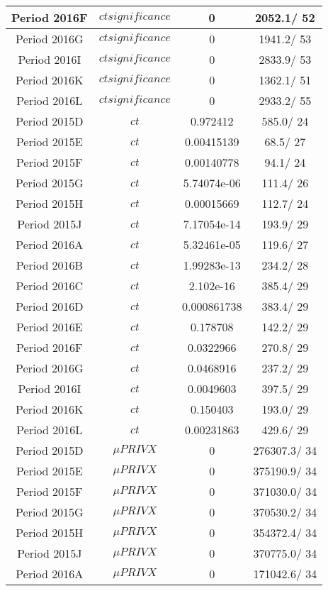 \documentclass{article}
\begin{document}
\begin{longtable}{c|c|c|c}
\hline
 Period 2016F & $ct significance$ & 0 & 2052.1/ 52\\
\hline
 Period 2016G & $ct significance$ & 0 & 1941.2/ 53\\
\hline
 Period 2016I & $ct significance$ & 0 & 2833.9/ 53\\
\hline
 Period 2016K & $ct significance$ & 0 & 1362.1/ 51\\
\hline
 Period 2016L & $ct significance$ & 0 & 2933.2/ 55\\
\hline
 Period 2015D & $ct$ & 0.972412 & 585.0/ 24\\
\hline
 Period 2015E & $ct$ & 0.00415139 &  68.5/ 27\\
\hline
 Period 2015F & $ct$ & 0.00140778 &  94.1/ 24\\
\hline
 Period 2015G & $ct$ & 5.74074e-06 & 111.4/ 26\\
\hline
 Period 2015H & $ct$ & 0.00015669 & 112.7/ 24\\
\hline
 Period 2015J & $ct$ & 7.17054e-14 & 193.9/ 29\\
\hline
 Period 2016A & $ct$ & 5.32461e-05 & 119.6/ 27\\
\hline
 Period 2016B & $ct$ & 1.99283e-13 & 234.2/ 28\\
\hline
 Period 2016C & $ct$ & 2.102e-16 & 385.4/ 29\\
\hline
 Period 2016D & $ct$ & 0.000861738 & 383.4/ 29\\
\hline
 Period 2016E & $ct$ & 0.178708 & 142.2/ 29\\
\hline
 Period 2016F & $ct$ & 0.0322966 & 270.8/ 29\\
\hline
 Period 2016G & $ct$ & 0.0468916 & 237.2/ 29\\
\hline
 Period 2016I & $ct$ & 0.0049603 & 397.5/ 29\\
\hline
 Period 2016K & $ct$ & 0.150403 & 193.0/ 29\\
\hline
 Period 2016L & $ct$ & 0.00231863 & 429.6/ 29\\
\hline
 Period 2015D & $\mu PRIVX$ & 0 & 276307.3/ 34\\
\hline
 Period 2015E & $\mu PRIVX$ & 0 & 375190.9/ 34\\
\hline
 Period 2015F & $\mu PRIVX$ & 0 & 371030.0/ 34\\
\hline
 Period 2015G & $\mu PRIVX$ & 0 & 370530.2/ 34\\
\hline
 Period 2015H & $\mu PRIVX$ & 0 & 354372.4/ 34\\
\hline
 Period 2015J & $\mu PRIVX$ & 0 & 370775.0/ 34\\
\hline
 Period 2016A & $\mu PRIVX$ & 0 & 171042.6/ 34\\

\end{longtable}
\end{document}
